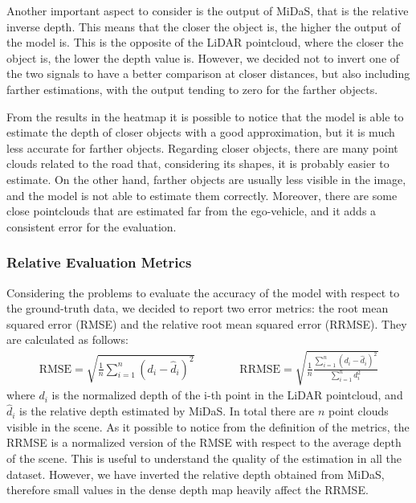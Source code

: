 Another important aspect to consider is the output of MiDaS, that is the relative 
inverse depth. This means that the closer the object is, the higher the output 
of the model is. This is the opposite of the LiDAR pointcloud, where the closer 
the object is, the lower the depth value is. However, we decided not to invert 
one of the two signals to have a better comparison at closer distances, but also 
including farther estimations, with the output tending to zero for the farther objects.

From the results in the heatmap it is possible to notice that the model is able 
to estimate the depth of closer objects with a good approximation, but it is 
much less accurate for farther objects. Regarding closer objects, there 
are many point clouds related to the road that, considering its shapes, it is 
probably easier to estimate. On the other hand, farther objects are usually 
less visible in the image, and the model is not able to estimate them correctly. 
Moreover, there are some close pointclouds that are estimated far from the ego-vehicle,
and it adds a consistent error for the evaluation.

\subsubsection*{Relative Evaluation Metrics}
Considering the problems to evaluate the accuracy of the model with respect to 
the ground-truth data, we decided to report two error metrics: the root mean 
squared error (RMSE) and the relative root mean squared error (RRMSE). 
They are calculated as follows:
\begin{align}
    \text{RMSE} = \sqrt{\frac{1}{n} \sum_{i=1}^{n} \left(d_i - \hat{d}_i\right)^2} \qquad\qquad
    \text{RRMSE} = \sqrt{\frac{1}{n} \frac{\sum_{i=1}^{n}{\left(d_i - \hat{d}_i\right)^2}}{\sum_{i=1}^{n}d_i^2}} \nonumber
\end{align}
where $d_i$ is the normalized depth of the i-th point in the LiDAR pointcloud, 
and $\hat{d}_i$ is the relative depth estimated by MiDaS. In total 
there are $n$ point clouds visible in the scene. As it possible to notice from the 
definition of the metrics, the RRMSE is a normalized version of the RMSE with 
respect to the average depth of the scene. This is useful to understand the 
quality of the estimation in all the dataset. However, we have inverted the 
relative depth obtained from MiDaS, therefore small values in the dense depth 
map heavily affect the RRMSE.

